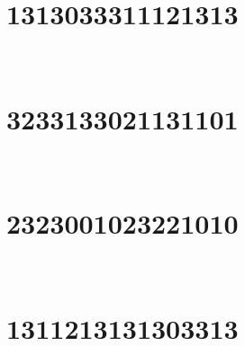 \,
\newline
\vspace{1.2cm}

\section{1313033311121313}

\marginnote[3\baselineskip]{\centering}



\,
\newline
\vspace{1.2cm}

\section{3233133021131101}

\marginnote[3\baselineskip]{\centering}



\,
\newline
\vspace{1.2cm}

\section{2323001023221010}

\marginnote[3\baselineskip]{\centering}



\,
\newline
\vspace{1.2cm}

\section{1311213131303313}

\marginnote[3\baselineskip]{\centering}



\,
\newline
\vspace{1.2cm}

